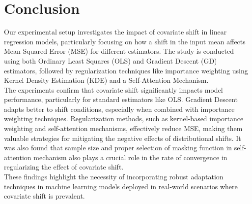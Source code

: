 \chapter{Conclusion}\label{chp:7}

Our experimental setup investigates the impact of covariate shift in linear regression models, particularly focusing on how a shift in the input mean affects Mean Squared Error (MSE) for different estimators. The study is conducted using both Ordinary Least Squares (OLS) and Gradient Descent (GD) estimators, followed by regularization techniques like importance weighting using Kernel Density Estimation (KDE) and a Self-Attention Mechanism.\\

The experiments confirm that covariate shift significantly impacts model performance, particularly for standard estimators like OLS. Gradient Descent adapts better to shift conditions, especially when combined with importance weighting techniques. Regularization methods, such as kernel-based importance weighting and self-attention mechanisms, effectively reduce MSE, making them valuable strategies for mitigating the negative effects of distributional shifts. It was also found that sample size and proper selection of masking function in self-attention mechanism also plays a crucial role in the rate of convergence in regularizing the effect of covariate shift.\\

These findings highlight the necessity of incorporating robust adaptation techniques in machine learning models deployed in real-world scenarios where covariate shift is prevalent.
